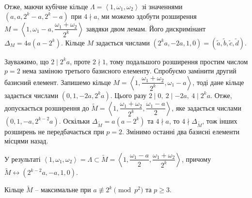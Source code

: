 \documentclass{thesis}
\begin{document}
Отже, маючи кубічне кільце $\Lambda = \left<1,\omega_1,\omega_2\right>$ зі значеннями $(a,a,2^k-a,2^k-a)$ при $4 \nmid a$, ми можемо здобути розширення $M = \left<1, \omega_1 - a, \dfrac{\omega_1+\omega_2}{2^{k}}\right>$ завдяки двом лемам. Його дискримінант $\Delta_M = 4a(a-2^k)$. Кільце $M$ задається числами $(2^ka,-2a,1,0) = (\tilde{a},\tilde{b},\tilde{c},\tilde{d})$.

Зауважимо, що $2 \mid 2^k a$, проте $2 \nmid 1$, тому подальшого розширення простим числом $p = 2$ нема заміною третього базисного елементу. Спробуємо замінити другий базисний елемент. Запишемо кільце $M = \left<1, \dfrac{\omega_1+\omega_2}{2^k}, \omega_1-a \right>$, тоді дане кільце задається числами $(0,1,-2a,2^ka)$. Цього разу $2 \mid 0,\ 2 \mid -2a,\ 4 \mid 2^k a$. Отже, допускається розширення до $\tilde{M} = \left< 1, \dfrac{\omega_1+\omega_2}{2^k}, \dfrac{\omega_1-a}{2}\right>$, яке задається числами $(0,1,-a,2^{k-2}a)$. Оскільки $\Delta_{\tilde{M}} = a(a-2^k)$ та $4 \nmid a$, то $4 \nmid \Delta_{\tilde{M}}$, тож інших розширень не передбачається при $p = 2$. Змінимо останні два базисні елементи місцями назад.

У результаті $\left<1,\omega_1,\omega_2\right> = \Lambda \subset \tilde{M} = \left< 1, \dfrac{\omega_1-a}{2}, \dfrac{\omega_1+\omega_2}{2^k}\right>$, причому $\tilde{M} \leftrightarrow (2^{k-2}a,-a,1,0)$.

\begin{proposition}
Кільце $\tilde{M}$ -- максимальне при $a \not\equiv 2^k \pmod {p^2}$ та $p \geq 3$.
\end{proposition}
\end{document}
